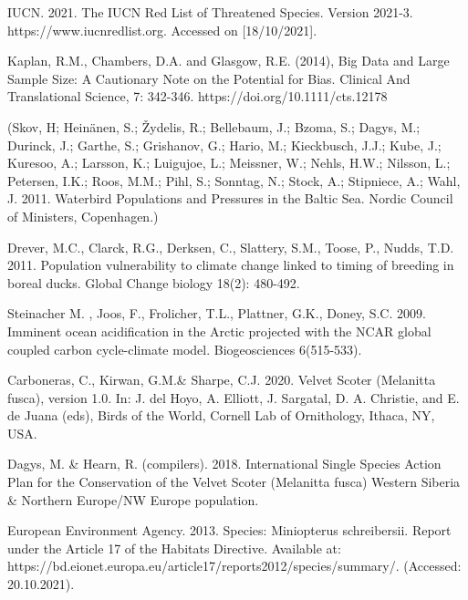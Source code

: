 \documentclass[12pt,a4paper]{article}
\begin{document}
\begin{thebibliography}{999}

IUCN. 2021. The IUCN Red List of Threatened Species. Version 2021-3. https://www.iucnredlist.org. Accessed on [18/10/2021].

Kaplan, R.M., Chambers, D.A. and Glasgow, R.E. (2014), Big Data and Large Sample Size: A Cautionary Note on the Potential for Bias. Clinical And Translational Science, 7: 342-346. https://doi.org/10.1111/cts.12178
 
(Skov, H; Heinänen, S.; Žydelis, R.; Bellebaum, J.; Bzoma, S.; Dagys, M.; Durinck, J.; Garthe, S.; Grishanov, G.; Hario, M.; Kieckbusch, J.J.; Kube, J.; Kuresoo, A.; Larsson, K.; Luigujoe, L.; Meissner, W.; Nehls, H.W.; Nilsson, L.; Petersen, I.K.; Roos, M.M.; Pihl, S.; Sonntag, N.; Stock, A.; Stipniece, A.; Wahl, J. 2011. Waterbird Populations and Pressures in the Baltic Sea. Nordic Council of Ministers, Copenhagen.)

Drever, M.C., Clarck, R.G., Derksen, C., Slattery, S.M., Toose, P., Nudds, T.D. 2011. Population vulnerability to climate change linked to timing of breeding in boreal ducks. Global Change biology 18(2): 480-492.

Steinacher M. , Joos, F., Frolicher, T.L., Plattner, G.K., Doney, S.C. 2009. Imminent ocean acidification in the Arctic projected with the NCAR global coupled carbon cycle-climate model. Biogeosciences 6(515-533).

Carboneras, C., Kirwan, G.M.\& Sharpe, C.J. 2020. Velvet Scoter (Melanitta fusca), version 1.0. In: J. del Hoyo, A. Elliott, J. Sargatal, D. A. Christie, and E. de Juana (eds), Birds of the World, Cornell Lab of Ornithology, Ithaca, NY, USA.

Dagys, M. \& Hearn, R. (compilers). 2018. International Single Species Action Plan for the Conservation of the Velvet Scoter (Melanitta fusca) Western Siberia \& Northern Europe/NW Europe population.

European Environment Agency. 2013. Species: Miniopterus schreibersii. Report under the Article 17 of the Habitats Directive. Available at: https://bd.eionet.europa.eu/article17/reports2012/species/summary/. (Accessed: 20.10.2021).


\end{thebibliography}
\end{document}
